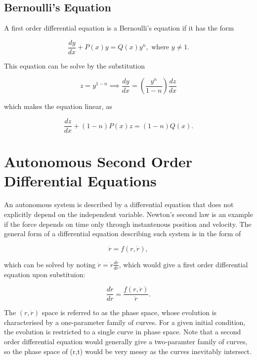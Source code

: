 \documentclass[english,a4paper,12pt]{report}
\begin{document}
\section{Bernoulli's Equation}

A first order differential equation is a Bernoulli's equation if it has the form

\begin{equation}
    \frac{dy}{dx} + P(x)y = Q(x)y^{n}, \text{ where } y\neq 1.  
\end{equation}

This equation can be solve by the substitution 

\begin{equation}
    z = y^{1-n} \implies \frac{dy}{dx} = \left( \frac{y^{n} }{1-n}  \right) \frac{dz}{dx}   
\end{equation}

which makes the equation linear, as

\begin{equation}
    \frac{dz}{dx} + (1-n) P(x)z = (1-n)Q(x).  
\end{equation}










\chapter{Autonomous Second Order Differential Equations}

An autonomous system is described by a differential equation that does not explicitly depend on the independent variable. Newton's second law is an example if the force depends on time only through instantenous position and velocity. The general form of a differential equation describing such system is in the form of 

\begin{equation}
    \ddot{r} = f(r,\dot{r} ),
\end{equation}

which can be solved by noting \(\ddot{r} = \dot{r} \frac{d \dot{r} }{dr}  \), which would give a first order differential equation upon substituion:

\begin{equation}
    \frac{d \dot{r} }{dr} = \frac{f(r,\dot{r} )}{\dot{r} } .
\end{equation}

The \((r,\dot{r} )\) space is referred to as the phase space, whose evolution is characterised by a one-parameter family of curves. For a given initial condition, the evolution is restricted to a single curve in phase space. Note that a second order differential equation would generally give a two-paramter family of curves, so the phase space of (r,t) would be very messy as the curves inevitably intersect.
\end{document}
